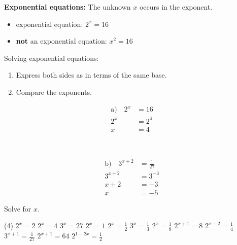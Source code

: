 \begin{tcolorbox}
	\textbf{Exponential equations:} The unknown $x$ occurs in the exponent.
	\begin{itemize}
		\item exponential equation: $2^x=16$
		\item \textbf{not} an exponential equation: $x^2=16$
	\end{itemize}
	Solving exponential equations:
	\begin{enumerate}[Step 1:]
		\item Express both sides as in terms of the same base.
		\item Compare the exponents.
	\end{enumerate}
\end{tcolorbox}
\begin{example}
	\begin{minipage}{0.45\textwidth}
		\begin{align*}
			\textrm{a)}\quad 2^x&=16 \\
			2^x&=2^4 \\
			x&=4 \\
			\phantom{x+2}& \\
			\phantom{x+2}&
		\end{align*}
	\end{minipage}\hfill
	\begin{minipage}{0.45\textwidth}
		\begin{align*}
			\textrm{b)}\quad 3^{x+2}&=\frac{1}{27} \\
			3^{x+2}&=3^{-3} \\
			x+2&=-3 \\
			x&=-5
		\end{align*}
	\end{minipage}
\end{example}
\begin{exercise}
	Solve for $x$.
	\begin{tasks}(4)
		\task $2^x=2$ \task $2^x=4$ \task $3^x=27$ \task $2^x=1$
		\task $2^x=\frac{1}{2}$ \task $3^x=\frac{1}{3}$ \task $2^x=\frac{1}{8}$ \task $2^{x+1}=8$
		\task $2^{x-2}=\frac{1}{4}$ \task $3^{x+1}=\frac{1}{27}$ \task $2^{x+1}=64$
		\task $2^{1-2x}=\frac{1}{2}$
	\end{tasks}
\end{exercise}
